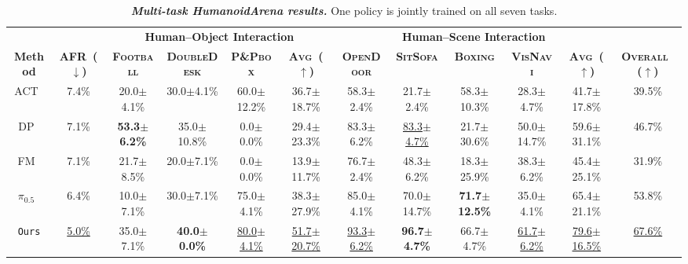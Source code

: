 \begin{table}[H]
  \caption{\textbf{\textit{Multi-task HumanoidArena results.}} One policy is jointly trained on all seven tasks.}
  \label{tab:arena_multi_task}
  \centering
  \begin{adjustbox}{max width=\textwidth}
  \setlength{\tabcolsep}{4.2pt}
  \renewcommand{\arraystretch}{1.08}

  \begin{tabular}{cccccc|cccccc}
  \toprule
  & &
  \multicolumn{4}{c|}{\textbf{Human--Object Interaction}} &
  \multicolumn{5}{c}{\textbf{Human--Scene Interaction}} & \\
  \cmidrule(lr){3-6}
  \cmidrule(lr){7-11}

  \multirow{-2}{*}{\textbf{Method}} &
  \multirow{-2}{*}{\textbf{AFR~($\downarrow$)}} &
  \textbf{\textsc{Football}} &
  \textbf{\textsc{DoubleDesk}} &
  \textbf{\textsc{P\&Pbox}} &
  \textbf{\textsc{Avg~($\uparrow$)}} &
  \textbf{\textsc{OpenDoor}} &
  \textbf{\textsc{SitSofa}} &
  \textbf{\textsc{Boxing}} &
  \textbf{\textsc{VisNavi}} &
  \textbf{\textsc{Avg~($\uparrow$)}} &
  \multirow{-2}{*}{\textbf{\textsc{Overall~($\uparrow$)}}} \\
  \midrule

  ACT~\cite{ACT}
  & 7.4\%
  & 20.0$\pm$4.1\%
  & 30.0$\pm$4.1\%
  & 60.0$\pm$12.2\%
  & 36.7$\pm$18.7\%
  & 58.3$\pm$2.4\%
  & 21.7$\pm$2.4\%
  & 58.3$\pm$10.3\%
  & 28.3$\pm$4.7\%
  & 41.7$\pm$17.8\%   & 39.5\% \\

  DP~\cite{chi2023diffusionpolicy}
  & 7.1\%
  & \textbf{53.3$\pm$6.2\%}
  & 35.0$\pm$10.8\%
  & 0.0$\pm$0.0\%
  & 29.4$\pm$23.3\%
  & 83.3$\pm$6.2\%
  & \underline{83.3$\pm$4.7\%}
  & 21.7$\pm$30.6\%
  & 50.0$\pm$14.7\%
  & 59.6$\pm$31.1\%   & 46.7\% \\

  FM~\cite{FM_objective}
  & 7.1\%
  & 21.7$\pm$8.5\%
  & 20.0$\pm$7.1\%
  & 0.0$\pm$0.0\%
  & 13.9$\pm$11.7\%
  & 76.7$\pm$2.4\%
  & 48.3$\pm$6.2\%
  & 18.3$\pm$25.9\%
  & 38.3$\pm$6.2\%
  & 45.4$\pm$25.1\%   & 31.9\% \\

  $\pi_{0.5}$~\cite{pi05}
  & 6.4\%
  & 10.0$\pm$7.1\%
  & 30.0$\pm$7.1\%
  & 75.0$\pm$4.1\%
  & 38.3$\pm$27.9\%
  & 85.0$\pm$4.1\%
  & 70.0$\pm$14.7\%
  & \textbf{71.7$\pm$12.5\%}
  & 35.0$\pm$4.1\%
  & 65.4$\pm$21.1\%   & 53.8\% \\

  \rowcolor{hclbrown!8!white}
  \texttt{Ours}
  & \underline{5.0\%}
  & 35.0$\pm$7.1\%
  & \textbf{40.0$\pm$0.0\%}
  & \underline{80.0$\pm$4.1\%}
  & \underline{51.7$\pm$20.7\%}
  & \underline{93.3$\pm$6.2\%}
  & \textbf{96.7$\pm$4.7\%}
  & 66.7$\pm$4.7\%
  & \underline{61.7$\pm$6.2\%}
  & \underline{79.6$\pm$16.5\%}   & \underline{67.6\%} \\



\end{tabular}
\end{adjustbox}
\end{table}
